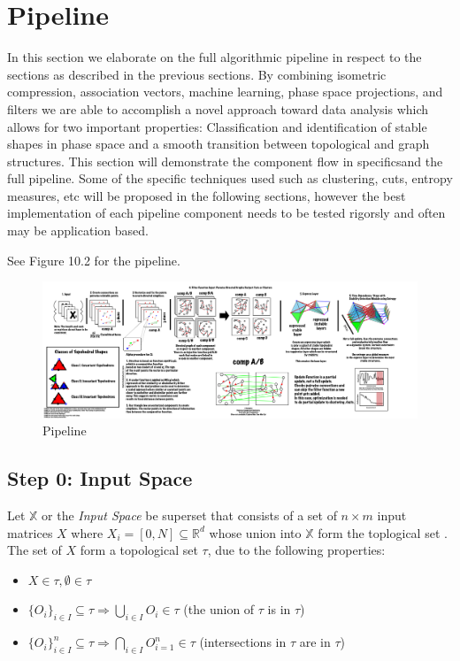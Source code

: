 \section{Pipeline}
In this section we elaborate on the full algorithmic pipeline in respect to the sections as described in the previous sections. By combining isometric compression, association vectors, machine learning, phase space projections, and filters we are able to accomplish a novel approach toward data analysis which allows for two important properties: Classification and identification of stable shapes in phase space and a smooth transition between topological and graph structures. This section will demonstrate the component flow in specificsand the full pipeline. Some of the specific techniques used such as clustering, cuts, entropy measures, etc will be proposed in the following sections, however the best implementation of each pipeline component needs to be tested rigorsly and often may be application based.

See Figure 10.2 for the pipeline. 

\begin{figure}
  \includegraphics[width=\textwidth]{images/pipeline3}
  \caption{Pipeline}
\end{figure}
\subsection{Step 0: Input Space}

Let $\mathbb{X}$ or the \textit{Input Space} be superset that consists of a set of $n \times m$ input matrices $X$ where $X_i = [0,N] \subseteq \mathbb{R}^d$ whose union into $\mathbb{X}$ form the toplogical set . The set of $X$ form a topological set $\tau$, due to the following properties:

\begin{itemize}
\item $X \in \tau, \emptyset \in \tau$
\item $\{O_i\}_{i \in I} \subseteq \tau \Rightarrow \bigcup_{i \in I}O_i \in \tau$ (the union of $\tau$ is in $\tau$)
\item $\{O_i\}_{i \in I}^n \subseteq \tau \Rightarrow \bigcap_{i \in I}O_{i=1}^n \in \tau$ (intersections in $\tau$ are in $\tau$)
\end{itemize}

